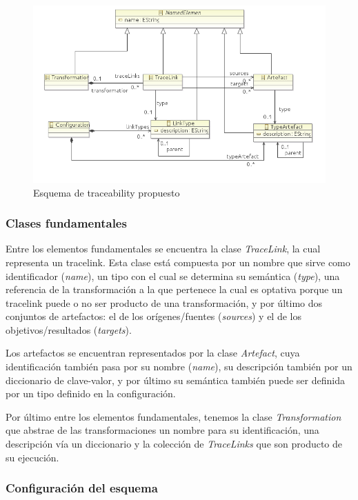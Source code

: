 \documentclass[a4paper,12pt,oneside,spanish]{book}
\begin{document}
\begin{figure}[hbtp]
\centering
\includegraphics[scale=0.75]{./img/Esquema}
\caption{Esquema de traceability propuesto}
\label{fig:EsquenaPropuesto}
\end{figure}


\subsubsection{Clases fundamentales}

Entre los elementos fundamentales se encuentra la clase \textsf{\textit{TraceLink}}, la cual representa un tracelink. Esta clase está compuesta por un nombre que sirve como identificador (\textsf{\textit{name}}), un tipo con el cual se determina su semántica (\textsf{\textit{type}}), una referencia de la transformación a la que pertenece la cual es optativa porque un tracelink puede o no ser producto de una transformación, y por último dos conjuntos de artefactos: el de los orígenes/fuentes (\textsf{\textit{sources}}) y el de los objetivos/resultados (\textsf{\textit{targets}}).

Los artefactos se encuentran representados por la clase \textsf{\textit{Artefact}}, cuya identificación también pasa por su nombre (\textsf{\textit{name}}), su descripción también por un diccionario de clave-valor, y por último su semántica también puede ser definida por un tipo definido en la configuración.

Por último entre los elementos fundamentales, tenemos la clase \textsf{\textit{Transformation}} que abstrae de las transformaciones un nombre para su identificación, una descripción vía un diccionario y la colección de \textit{\textsf{TraceLinks}} que son producto de su ejecución.


\subsubsection{Configuración del esquema}
\end{document}
